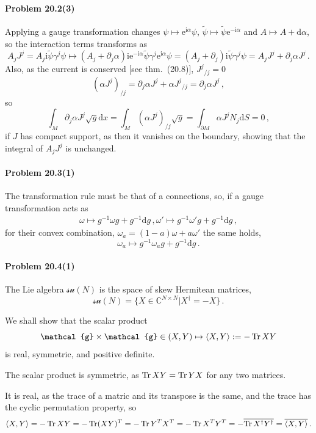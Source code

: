 \documentclass[a4paper,12pt]{article}
\def\d{\mathrm{d}}
\def\e{\mathrm{e}}
\def\imagi{\mathrm{i}}
\def\Tr{\ensuremath{\mathop{\rm Tr}}}
\newcommand{\problem}[1]{\paragraph{Problem #1}}
\begin{document}

\problem{20.2(3)} Applying a gauge transformation changes $\psi\mapsto \e^{\imagi\alpha}\psi$, $\tilde\psi \mapsto \tilde\psi\e^{-\imagi\alpha}$ and $A\mapsto A +\d\alpha$, so the interaction terms transforms as
\[
 A_j J^j = A_j \imagi \tilde\psi \gamma^j \psi \mapsto (A_j + \partial_j \alpha) \imagi \e^{-\imagi\alpha}\tilde\psi \gamma^j \e^{\imagi \alpha} \psi = (A_j+\partial_j) \imagi \tilde\psi \gamma^j \psi = A_j J^j + \partial_j \alpha J^j\,.
\]
Also, as the current is conserved [see thm.\ (20.8)], $J^j{}_{/j}=0$
\[
(\alpha J^j)_{/j} = \partial_j \alpha J^j + \alpha J^j{}_{/j} = \partial_j \alpha J^j\,,
\]
so
\[
 \int_M \partial_j \alpha J^j \sqrt{g}\d x =\int_M (\alpha J^j)_{/j}\sqrt{g} =\int_{\partial M} \alpha J^j N_j \d S = 0\,,
\]
if $J$ has compact support, as then it vanishes on the boundary, showing that the integral of $A_j J^j$ is unchanged.


\problem{20.3(1)} The transformation rule must be that of a connections, so, if a gauge transformation acts as
\[
\begin{aligned}
 \omega\mapsto  g^{-1} \omega g + g^{-1}\d g\,,
 \omega'\mapsto  g^{-1} \omega' g + g^{-1}\d g\,,
\end{aligned}
\]
for their convex combination, $\omega_a = (1-a)\omega+a\omega'$ the same holds,
\[
\omega_a \mapsto g^{-1} \omega_a g + g^{-1}\d g\,.
\]


\problem{20.4(1)} The Lie algebra $\mathcal{su}(N)$ is the space of skew Hermitean matrices,
\[
 \mathcal{su}(N) = \{ X\in \mathbb{C}^{N\times N}| X^\dagger = -X\}\,.
\]

We shall show that the scalar product
\[
 \mathcal{g}\times\mathcal{g}\in (X, Y) \mapsto \langle X, Y \rangle := -\Tr X Y
\]
is real, symmetric, and positive definite.

The scalar product is symmetric, as $\Tr X Y = \Tr Y X$ for any two matrices.

It is real, as the trace of a matric and its transpose is the same, and the trace has the cyclic permutation property, so
\[
 \langle X, Y \rangle = -\Tr X Y = - \Tr (X Y)^T = -\Tr Y^T X^T = -\Tr X^T Y^T = -\overline{ \Tr X^\dagger Y^\dagger} = \overline{\langle X, Y \rangle}\,.
\]
\end{document}
